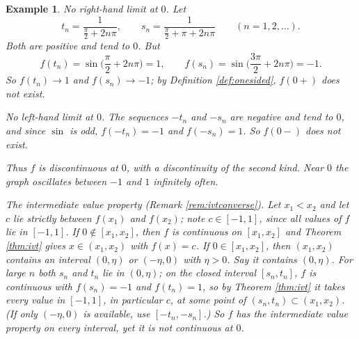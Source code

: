 \documentclass{article}
\theoremstyle{mythm}
\newtheorem{example}[theorem]{Example}
\begin{document}
\begin{example}
\textit{No right-hand limit at $0$.} Let
\[
t_n = \frac{1}{\frac{\pi}{2} + 2n\pi}, \qquad s_n = \frac{1}{\frac{\pi}{2} + \pi + 2n\pi} \qquad (n = 1, 2, \dots).
\]
Both are positive and tend to $0$. But
\[
f(t_n) = \sin\Big(\frac{\pi}{2} + 2n\pi\Big) = 1, \qquad f(s_n) = \sin\Big(\frac{3\pi}{2} + 2n\pi\Big) = -1.
\]
So $f(t_n) \to 1$ and $f(s_n) \to -1$; by Definition \ref{def:onesided}, $f(0+)$ does not exist.

\textit{No left-hand limit at $0$.} The sequences $-t_n$ and $-s_n$ are negative and tend to $0$, and since $\sin$ is odd, $f(-t_n) = -1$ and $f(-s_n) = 1$. So $f(0-)$ does not exist.

Thus $f$ is discontinuous at $0$, with a discontinuity of the second kind. Near $0$ the graph oscillates between $-1$ and $1$ infinitely often.

\textit{The intermediate value property (Remark \ref{rem:ivtconverse}).} Let $x_1 < x_2$ and let $c$ lie strictly between $f(x_1)$ and $f(x_2)$; note $c \in [-1,1]$, since all values of $f$ lie in $[-1,1]$. If $0 \notin [x_1, x_2]$, then $f$ is continuous on $[x_1, x_2]$ and Theorem \ref{thm:ivt} gives $x \in (x_1,x_2)$ with $f(x) = c$. If $0 \in [x_1, x_2]$, then $(x_1, x_2)$ contains an interval $(0, \eta)$ or $(-\eta, 0)$ with $\eta > 0$. Say it contains $(0, \eta)$. For large $n$ both $s_n$ and $t_n$ lie in $(0, \eta)$; on the closed interval $[s_n, t_n]$, $f$ is continuous with $f(s_n) = -1$ and $f(t_n) = 1$, so by Theorem \ref{thm:ivt} it takes every value in $[-1,1]$, in particular $c$, at some point of $(s_n, t_n) \subset (x_1,x_2)$. (If only $(-\eta,0)$ is available, use $[-t_n, -s_n]$.) So $f$ has the intermediate value property on every interval, yet it is not continuous at $0$.
\end{example}
\end{document}
